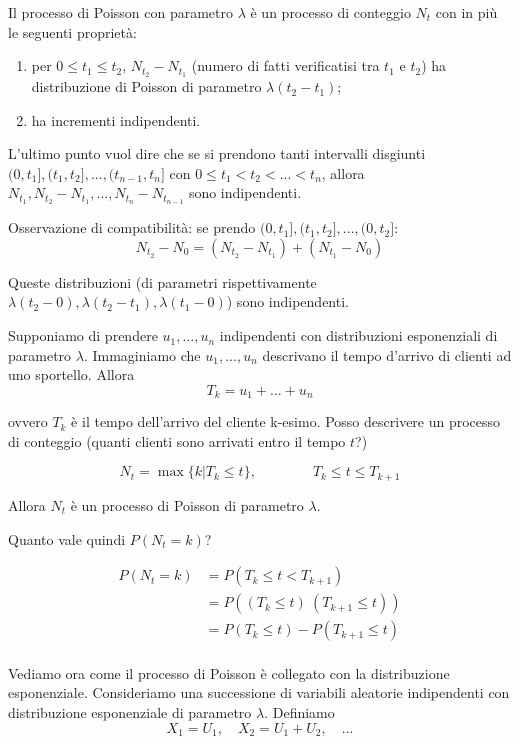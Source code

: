 \documentclass[a4paper,12pt]{book}
\begin{document}
Il processo di Poisson con parametro $\lambda$ è un processo di conteggio $ N_t $ con in più le seguenti proprietà:
\begin{enumerate}
	\item per $ 0 \le t_1 \le t_2 $, $ N_{t_2} - N_{t_1} $ (numero di fatti verificatisi tra $ t_1 $ e $ t_2 $) ha distribuzione di Poisson di parametro $\lambda(t_2 - t_1)$;
	\item ha incrementi indipendenti.
\end{enumerate}

L'ultimo punto vuol dire che se si prendono tanti intervalli disgiunti $ (0, t_1], (t_1, t_2], ..., (t_{n-1}, t_n] $  con $ 0 \le t_1 < t_2 < ... < t_n $, allora $ N_{t_1}, N_{t_2} - N_{t_1}, ..., N_{t_n} - N_{t_{n-1}} $ sono indipendenti.

Osservazione di compatibilità: se prendo $ (0, t_1 ], (t_1, t_2], ..., (0, t_2] $:
$$ N_{t_2} - N_0 = (N_{t_2} - N_{t_1}) + (N_{t_1} - N_0) $$

Queste distribuzioni (di parametri rispettivamente $\lambda(t_2 - 0),\lambda(t_2 - t_1),\lambda(t_1 - 0) $) sono indipendenti. 

Supponiamo di prendere $ u_1, ..., u_n $ indipendenti con distribuzioni esponenziali di parametro $\lambda$. Immaginiamo che $ u_1, ..., u_n $ descrivano il tempo d'arrivo di clienti ad uno sportello. Allora
$$ T_k = u_1 + ... + u_n $$

ovvero $ T_k $ è il tempo dell'arrivo del cliente k-esimo. Posso descrivere un processo di conteggio (quanti clienti sono arrivati entro il tempo $ t $?)

$$ N_t = \max \{k | T_k \le t \}, \qquad \qquad T_k \le t \le T_{k+1} $$

Allora $ N_t $ è un processo di Poisson di parametro $\lambda$.

Quanto vale quindi $ P(N_t = k) $?

\begin{align*}
	P(N_t = k) & = P(T_k \le t < T_{k+1}) \\
	& = P((T_k \le t) \ (T_{k+1} \le t)) \\
	& = P(T_k \le t) - P(T_{k+1} \le t)
\end{align*}
\\
Vediamo ora come il processo di Poisson è collegato con la distribuzione esponenziale. 
Consideriamo una successione di variabili aleatorie indipendenti con distribuzione esponenziale di parametro $\lambda$. Definiamo 
$$ X_1 = U_1, \quad X_2 = U_1 + U_2, \quad ...$$
\end{document}

